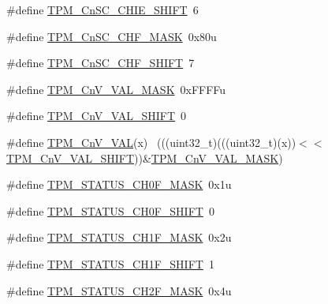 \begin{DoxyCompactItemize}
\item 
\#define \hyperlink{group___t_p_m___register___masks_ga621c521a5a2376b0685156af85a93b56}{T\+P\+M\+\_\+\+Cn\+S\+C\+\_\+\+C\+H\+I\+E\+\_\+\+S\+H\+I\+FT}~6
\item 
\#define \hyperlink{group___t_p_m___register___masks_gac8ec8543edea61f3ebe7c98f09addd6c}{T\+P\+M\+\_\+\+Cn\+S\+C\+\_\+\+C\+H\+F\+\_\+\+M\+A\+SK}~0x80u
\item 
\#define \hyperlink{group___t_p_m___register___masks_ga070c2d7e35f829f8f2025682c04193d8}{T\+P\+M\+\_\+\+Cn\+S\+C\+\_\+\+C\+H\+F\+\_\+\+S\+H\+I\+FT}~7
\item 
\#define \hyperlink{group___t_p_m___register___masks_gab65cebe025551107c0b6dd05e5795ae5}{T\+P\+M\+\_\+\+Cn\+V\+\_\+\+V\+A\+L\+\_\+\+M\+A\+SK}~0x\+F\+F\+F\+Fu
\item 
\#define \hyperlink{group___t_p_m___register___masks_ga89562c16ce3c849bd51b1ba1e124b307}{T\+P\+M\+\_\+\+Cn\+V\+\_\+\+V\+A\+L\+\_\+\+S\+H\+I\+FT}~0
\item 
\#define \hyperlink{group___t_p_m___register___masks_ga86c8881ce8afb9dd086de5330efa5222}{T\+P\+M\+\_\+\+Cn\+V\+\_\+\+V\+AL}(x)                                                  ~(((uint32\+\_\+t)(((uint32\+\_\+t)(x))$<$$<$\hyperlink{group___t_p_m___register___masks_ga89562c16ce3c849bd51b1ba1e124b307}{T\+P\+M\+\_\+\+Cn\+V\+\_\+\+V\+A\+L\+\_\+\+S\+H\+I\+FT}))\&\hyperlink{group___t_p_m___register___masks_gab65cebe025551107c0b6dd05e5795ae5}{T\+P\+M\+\_\+\+Cn\+V\+\_\+\+V\+A\+L\+\_\+\+M\+A\+SK})
\item 
\#define \hyperlink{group___t_p_m___register___masks_ga2441823dbe4ebc3b7f88773a95eff6d6}{T\+P\+M\+\_\+\+S\+T\+A\+T\+U\+S\+\_\+\+C\+H0\+F\+\_\+\+M\+A\+SK}~0x1u
\item 
\#define \hyperlink{group___t_p_m___register___masks_gab7b122b8ff741ae1bacff6a0929d7adc}{T\+P\+M\+\_\+\+S\+T\+A\+T\+U\+S\+\_\+\+C\+H0\+F\+\_\+\+S\+H\+I\+FT}~0
\item 
\#define \hyperlink{group___t_p_m___register___masks_gaed654f625ebff2d9f8a2cc89ef410330}{T\+P\+M\+\_\+\+S\+T\+A\+T\+U\+S\+\_\+\+C\+H1\+F\+\_\+\+M\+A\+SK}~0x2u
\item 
\#define \hyperlink{group___t_p_m___register___masks_ga531fc0daa18458bc1d781df31cffbfe9}{T\+P\+M\+\_\+\+S\+T\+A\+T\+U\+S\+\_\+\+C\+H1\+F\+\_\+\+S\+H\+I\+FT}~1
\item 
\#define \hyperlink{group___t_p_m___register___masks_ga151f2aa4b0d2eef94e75170580ca4c13}{T\+P\+M\+\_\+\+S\+T\+A\+T\+U\+S\+\_\+\+C\+H2\+F\+\_\+\+M\+A\+SK}~0x4u
\item 
$$
\end{DoxyCompactItemize}
